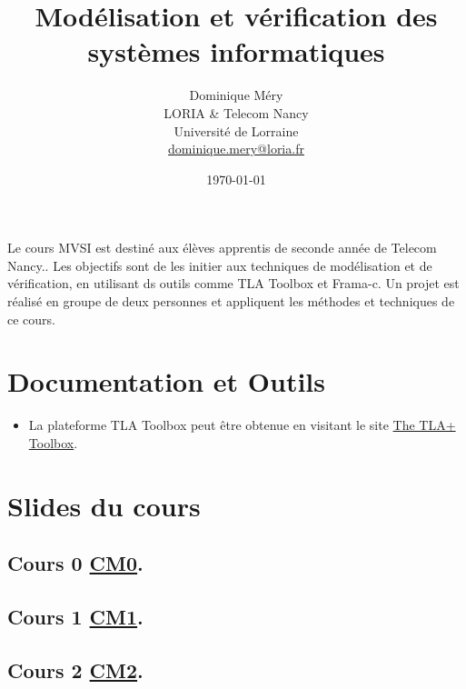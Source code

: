 \documentclass[ 12pt]{article}
\title{Modélisation et vérification des systèmes informatiques}
\author{Dominique M\'ery\\
LORIA \& Telecom Nancy\\ Universit\'e de Lorraine\\ \url{dominique.mery@loria.fr}}
\date{\today}
\begin{document}
  \setcounter{ex}{1}
\maketitle

Le cours MVSI  est destiné aux élèves apprentis de seconde année  de
Telecom Nancy..
Les objectifs sont de les initier aux techniques de modélisation et
de vérification, en utilisant ds outils comme TLA Toolbox et Frama-c.
Un projet est réalisé  en groupe de deux personnes et appliquent  les
méthodes  et techniques de ce cours.



  \tableofcontents

\section{Documentation et Outils}




\begin{itemize}

  
\item La plateforme TLA Toolbox peut être  obtenue en visitant le site  \href{https://lamport.azurewebsites.net/tla/toolbox.html}{The TLA+ Toolbox}.


  
\end{itemize}


\section{Slides du cours}
\label{sec:course-mcfsi-at}




\subsection{Cours 0
  \href{http://mery54.github.io/teaching/mvsi/lecturesnotes/lectures-app-2024-cm0.pdf}{CM0}. }




\subsection{Cours 1
  \href{http://mery54.github.io/teaching/mvsi/lecturesnotes/lectures-app-2024-cm1.pdf}{CM1}. }


  
\subsection{Cours 2
  \href{http://mery54.github.io/teaching/mvsi/lecturesnotes/lectures-app-2024-cm2.pdf}{CM2}. }
\end{document}

